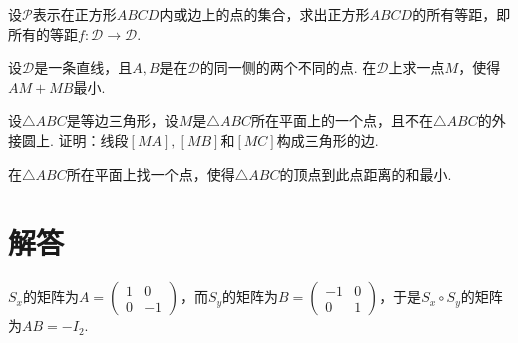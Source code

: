 \begin{mybox}
  \begin{problem}[正方形的等距.]

    设$\mathscr P$表示在正方形$ABCD$内或边上的点的集合，求出正方形$ABCD$的所有等距，即所有的等距$f:\mathscr D\to\mathscr D$.
  \end{problem}
\end{mybox}

\begin{problem}[台球问题.]

  设$\mathscr D$是一条直线，且$A,B$是在$\mathscr D$的同一侧的两个不同的点. 在$\mathscr D$上求一点$M$，使得$AM+MB$最小.
\end{problem}

\begin{problem}[Pompeiu定理.]

  设$\triangle ABC$是等边三角形，设$M$是$\triangle ABC$所在平面上的一个点，且不在$\triangle ABC$的外接圆上. 证明：线段$[MA],[MB]$和$[MC]$构成三角形的边.
\end{problem}

\begin{problem}[Torricelli点.]
  在$\triangle ABC$所在平面上找一个点，使得$\triangle ABC$的顶点到此点距离的和最小.
\end{problem}

\section{解答}
\begin{solution}
  $S_x$的矩阵为$A=\begin{pmatrix}
    1 & 0 \\
    0 & -1
  \end{pmatrix}$，而$S_y$的矩阵为$B=\begin{pmatrix}
    -1 & 0 \\
    0 & 1
  \end{pmatrix}$，于是$S_x\circ S_y$的矩阵为$AB=-I_2$.
\end{solution}

